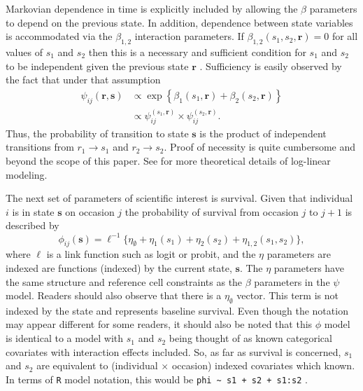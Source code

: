 \documentclass[fleqn]{article}
\newcommand{\bs}{\ensuremath{\mathbf{s}}}
\newcommand{\br}{\ensuremath{\mathbf{r}}}
\begin{document}
Markovian dependence in time is explicitly included by allowing the $\beta$ parameters to depend on the previous state. In addition, dependence between state variables is accommodated via the $\beta_{1,2}$ interaction parameters. If $\beta_{1,2}(s_1,s_2,\br)=0$ for all values of $s_1$ and $s_2$ then this is a necessary and sufficient condition for $s_1$ and $s_2$ to be independent given the previous state $\br$ \citep{xxx}. Sufficiency is easily observed by the fact that under that assumption
\begin{equation}
\begin{split}
\psi_{ij}(\br,\bs) &\propto \exp\left\{\beta_1(s_1,\br) + \beta_2(s_2,\br)\right\}\\
 & \propto \psi_{ij}^{(s_1,\br)}\times \psi_{ij}^{(s_2,\br)}.
 \end{split}
 \end{equation}
Thus, the probability of transition to state $\bs$ is the product of independent transitions from $r_1 \to s_1$ and $r_2 \to s_2$. Proof of necessity is quite cumbersome and beyond the scope of this paper. See \citet{xxx} for more theoretical details of log-linear modeling. 

The next set of parameters of scientific interest is survival. Given that individual $i$ is in state $\bs$ on occasion $j$ the probability of survival from occasion $j$ to $j+1$ is described by
\begin{equation}
\phi_{ij}(\bs) = \ell^{-1}\{\eta_\emptyset + \eta_1(s_1) + \eta_2(s_2) + \eta_{1,2}(s_1,s_2)\},
\end{equation}
where $\ell$ is a link function such as logit or probit, and the $\eta$ parameters are indexed are functions (indexed) by the current state, $\bs$. The $\eta$ parameters have the same structure and reference cell constraints as the $\beta$ parameters  in the $\psi$ model. Readers should also observe that there is a $\eta_\emptyset$ vector. This term is not indexed by the state and represents baseline survival. Even though the notation may appear different for some readers, it should also be noted that this $\phi$ model is identical to a model with $s_1$ and $s_2$ being thought of as known categorical covariates with interaction effects included. So, as far as survival is concerned, $s_1$ and $s_2$ are equivalent to (individual $\times$ occasion) indexed covariates which known. In terms of {\tt R} model notation, this would be \verb#phi ~ s1 + s2 + s1:s2# .
\end{document}
